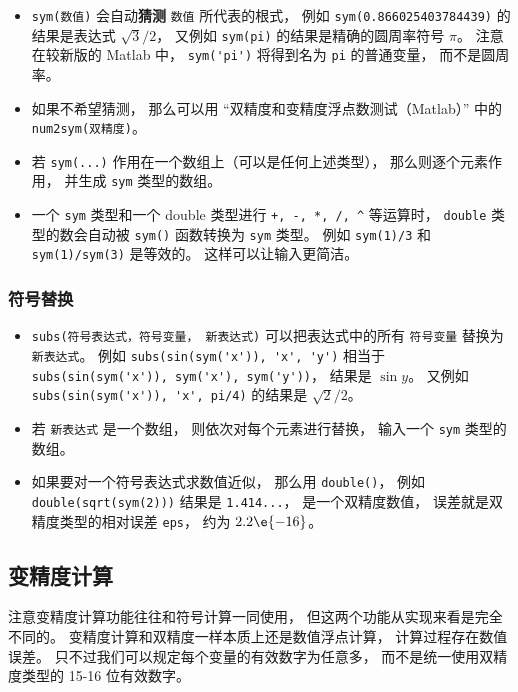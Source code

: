 \begin{itemize}
\item  \verb|sym(数值)| 会自动\textbf{猜测} \verb|数值| 所代表的根式， 例如 \verb|sym(0.866025403784439)| 的结果是表达式 $\sqrt{3}/2$， 又例如 \verb|sym(pi)| 的结果是精确的圆周率符号 $\pi$。 注意在较新版的 Matlab 中， \verb|sym('pi')| 将得到名为 \verb|pi| 的普通变量， 而不是圆周率。

\item 如果不希望猜测， 那么可以用 “双精度和变精度浮点数测试（Matlab）” 中的 \verb|num2sym(双精度)|。

\item 若 \verb|sym(...)| 作用在一个数组上（可以是任何上述类型）， 那么则逐个元素作用， 并生成 \verb|sym| 类型的数组。

\item 一个 \verb|sym| 类型和一个 double 类型进行 \verb|+, -, *, /, ^| 等运算时， \verb|double| 类型的数会自动被 \verb|sym()| 函数转换为 \verb|sym| 类型。 例如 \verb|sym(1)/3| 和 \verb|sym(1)/sym(3)| 是等效的。 这样可以让输入更简洁。
\end{itemize}

\subsubsection{符号替换}
\begin{itemize}
\item \verb|subs(符号表达式，符号变量， 新表达式)| 可以把表达式中的所有 \verb|符号变量| 替换为 \verb|新表达式|。 例如 \verb|subs(sin(sym('x')), 'x', 'y')| 相当于 \verb|subs(sin(sym('x')), sym('x'), sym('y'))|， 结果是 $\sin y$。 又例如 \verb|subs(sin(sym('x')), 'x', pi/4)| 的结果是 $\sqrt 2/2$。
\item 若 \verb|新表达式| 是一个数组， 则依次对每个元素进行替换， 输入一个 \verb|sym| 类型的数组。
\item 如果要对一个符号表达式求数值近似， 那么用 \verb|double()|， 例如 \verb|double(sqrt(sym(2)))| 结果是 \verb|1.414...|， 是一个双精度数值， 误差就是双精度类型的相对误差 \verb|eps|， 约为 $2.2\e{-16}$。
\end{itemize}

\subsection{变精度计算}
注意变精度计算功能往往和符号计算一同使用， 但这两个功能从实现来看是完全不同的。 变精度计算和双精度一样本质上还是数值浮点计算， 计算过程存在数值误差。 只不过我们可以规定每个变量的有效数字为任意多， 而不是统一使用双精度类型的 15-16 位有效数字。

